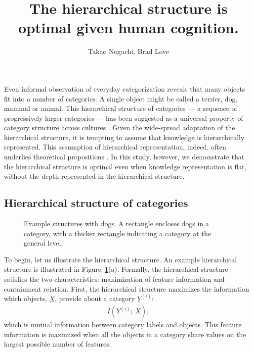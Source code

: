 \documentclass[doc]{apa6}
\title{The hierarchical structure is optimal given human cognition.}
\author{Takao Noguchi, Brad Love}
\affiliation{Department of Experimental Psychology, University College London}
\begin{document}
\maketitle

Even informal observation of everyday categorization reveals that many objects fit into a number of
categories. A single object might be called a terrier, dog, mammal or animal. This hierarchical
structure of categories --- a sequence of progressively larger categories --- has been suggested as
a universal property of category structure across cultures \parencite{Berlin1992a, Atran1998a}.
Given the wide-spread adaptation of the hierarchical structure, it is tempting to assume that
knowledge is hierarchically represented. This assumption of hierarchical representation, indeed,
often underlies theoretical propositions \parencite[e.g.,][]{Tenenbaum2011a}. In this study,
however, we demonstrate that the hierarchical structure is optimal even when knowledge
representation is flat, without the depth represented in the hierarchical structure.


\subsection*{Hierarchical structure of categories}

\begin{figure}
    \centering



    \vspace{10pt}

    \caption{Example structures with dogs. A rectangle encloses dogs in a category, with a thicker
    rectangle indicating a category at the general level.}

\label{fig:example}
\end{figure}

To begin, let us illustrate the hierarchical structure.  An example hierarchical structure is
illustrated in Figure~\ref{fig:example}(a). Formally, the hierarchical structure satisfies the two
characteristics: maximization of feature information and containment relation.  First, the
hierarchical structure maximizes the information which objects, $X$, provide about a category
$Y^{(i)}$:
\begin{align}
    I \left( Y^{(i)};\, X \right),
\label{eqn:feature}
\end{align}
which is mutual information between category labels and objects. This feature information is
maximized when all the objects in a category share values on the largest possible number of
features.
\end{document}
